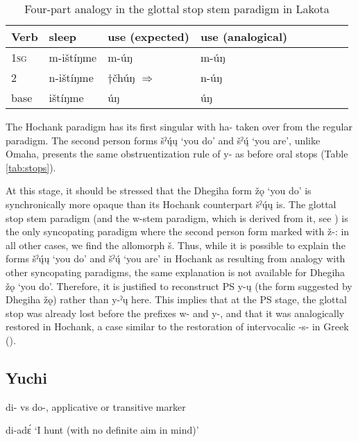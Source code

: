 \documentclass[oneside,a4paper,11pt]{article}
\newcommand{\ipa}[1]{{\phon#1}} %
\begin{document}
\begin{table}[H]
\caption{Four-part analogy in the glottal stop stem paradigm in Lakota} \label{tab:analogy.glottal} \centering
\begin{tabular}{lllllllll}
\toprule
Verb & sleep & use (expected) & use (analogical) \\
\midrule
\textsc{1sg} &\ipa{m-ištíŋme} &\ipa{m-úŋ} &\ipa{m-úŋ} &\\
2 & 	\ipa{n-ištíŋme}&$\dagger$\ipa{čhúŋ} $\Rightarrow$ &\ipa{n-úŋ} &  \\ 
base & \ipa{ištíŋme}	 &\ipa{úŋ} &\ipa{úŋ} & 	\\
\bottomrule
\end{tabular}
\end{table}

The Hochank paradigm has its first singular with \ipa{ha-} taken over from the regular paradigm. The second person forms \ipa{šˀų́ų} `you do' and \ipa{šˀų́} `you are', unlike Omaha, presents the same obstruentization rule of \ipa{*y-} as before oral stops (Table \ref{tab:stops}).

At this stage, it should be stressed that the Dhegiha form \ipa{žǫ} `you do' is synchronically more opaque than its Hochank counterpart \ipa{šˀų́ų} is. The glottal stop stem paradigm (and the w-stem paradigm, which is derived from it, see \citealt[496]{rankin05quapaw}) is the only syncopating paradigm where the second person form marked with \ipa{ž-}: in all other cases, we find the allomorph \ipa{š}. Thus, while it is possible to explain the forms \ipa{šˀų́ų} `you do' and \ipa{šˀų́} `you are' in Hochank as resulting from analogy with other syncopating paradigms, the same explanation is not available for Dhegiha \ipa{žǫ} `you do'. Therefore, it is justified to reconstruct PS \ipa{*y-ų} (the form suggested by Dhegiha \ipa{žǫ}) rather than \ipa{*y-ˀų} here. This implies that at the PS stage, the glottal stop was already lost before the prefixes \ipa{*w-} and \ipa{*y-}, and that it was analogically restored in Hochank, a case similar to the restoration of intervocalic -s- in Greek (\citealt{hill14conditioned}).

\subsection{Yuchi}
 



\ipa{di-} vs \ipa{do-}, applicative or transitive marker
\citet[328]{wagner38yuchi}

\ipa{di-adɛ́} `I hunt (with no definite aim in mind)'
\end{document}
